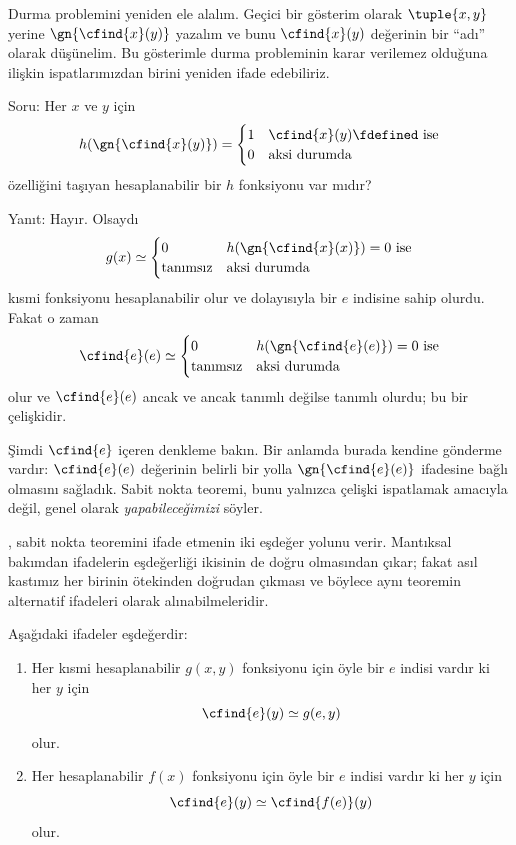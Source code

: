 \documentclass[../../../include/open-logic-section]{subfiles}
\begin{document}

Durma problemini yeniden ele alalım. Geçici bir gösterim olarak
$\tuple{x,y}$ yerine $\gn{\cfind{x}(y)}$ yazalım ve bunu
$\cfind{x}(y)$ değerinin bir ``adı'' olarak düşünelim. Bu gösterimle durma
probleminin karar verilemez olduğuna ilişkin ispatlarımızdan birini yeniden
ifade edebiliriz.

Soru: Her $x$ ve $y$ için
\[
  h(\gn{\cfind{x}(y)})=\begin{cases}
    1 & \text{$\cfind{x}(y)\fdefined$ ise}\\
    0 & \text{aksi durumda}
  \end{cases}
\]
özelliğini taşıyan hesaplanabilir bir $h$ fonksiyonu var mıdır?

Yanıt: Hayır. Olsaydı
\[
  g(x)\simeq\begin{cases}
    0 & \text{$h(\gn{\cfind{x}(x)})=0$ ise}\\
    \text{tanımsız} & \text{aksi durumda}
  \end{cases}
\]
kısmi fonksiyonu hesaplanabilir olur ve dolayısıyla bir $e$ indisine sahip
olurdu. Fakat o zaman
\[
  \cfind{e}(e)\simeq\begin{cases}
    0 & \text{$h(\gn{\cfind{e}(e)})=0$ ise}\\
    \text{tanımsız} & \text{aksi durumda}
  \end{cases}
\]
olur ve $\cfind{e}(e)$ ancak ve ancak tanımlı değilse tanımlı olurdu; bu bir
çelişkidir.

Şimdi $\cfind{e}$ içeren denkleme bakın. Bir anlamda burada kendine gönderme
vardır: $\cfind{e}(e)$ değerinin belirli bir yolla
$\gn{\cfind{e}(e)}$ ifadesine bağlı olmasını sağladık. Sabit nokta teoremi,
bunu yalnızca çelişki ispatlamak amacıyla değil, genel olarak
\emph{yapabileceğimizi} söyler.

, sabit nokta teoremini ifade etmenin iki eşdeğer
yolunu verir. Mantıksal bakımdan ifadelerin eşdeğerliği ikisinin de doğru
olmasından çıkar; fakat asıl kastımız her birinin ötekinden doğrudan çıkması
ve böylece aynı teoremin alternatif ifadeleri olarak alınabilmeleridir.

\begin{lem}
Aşağıdaki ifadeler eşdeğerdir:
\begin{enumerate}
\item Her kısmi hesaplanabilir $g(x,y)$ fonksiyonu için öyle bir $e$ indisi
  vardır ki her $y$ için
  \[
    \cfind{e}(y)\simeq g(e,y)
  \]
  olur.
\item Her hesaplanabilir $f(x)$ fonksiyonu için öyle bir $e$ indisi vardır
  ki her $y$ için
  \[
    \cfind{e}(y)\simeq\cfind{f(e)}(y)
  \]
  olur.
\end{enumerate}
\end{lem}
\end{document}
